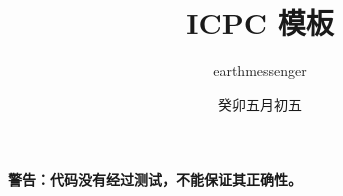 \documentclass{article}
\title{ICPC 模板}
\author{earthmessenger}
\date{癸卯五月初五}
\begin{document}
\maketitle

\clearpage

\textbf{警告：代码没有经过测试，不能保证其正确性。}

\tableofcontents







\end{document}

